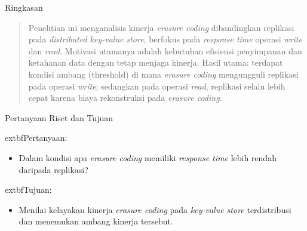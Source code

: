 \documentclass[a2,portrait]{config/poster/a0poster}
\newcommand{\postersection}[1]{%
	\begin{tcolorbox}[
		colback=ITBblue,
		colframe=ITBblue,
		fonttitle=\bfseries,
		coltext=white,
		sharp corners,
		boxrule=0pt,
		top=0pt,
		bottom=0pt,
		halign=center
	]
	\normalsize #1
	\end{tcolorbox}%
}
\begin{document}
\begin{multicols}{2} %
\small %
\vspace{0.05cm}

\newcommand{\twocolimg}[2]{%
	\begin{center}
		\parbox{\dimexpr2\columnwidth+\columnsep\relax}{%
			\centering
			\texttt{[image: \#1]}
			\captionof{figure}{#2}
		}
	\end{center}
}

\newcommand{\onecolimg}[2]{%
	\begin{center}
		\parbox{\columnwidth}{%
			\centering
			\texttt{[image: \#1]}
			\captionof{figure}{#2}
		}
	\end{center}
}


\postersection{Ringkasan}
\begin{quote}
	Penelitian ini menganalisis kinerja \textit{erasure coding} dibandingkan replikasi pada \textit{distributed key-value store}, berfokus pada \textit{response time} operasi \textit{write} dan \textit{read}. Motivasi utamanya adalah kebutuhan efisiensi penyimpanan dan ketahanan data dengan tetap menjaga kinerja. Hasil utama: terdapat kondisi ambang (threshold) di mana \textit{erasure coding} mengungguli replikasi pada operasi \textit{write}; sedangkan pada operasi \textit{read}, replikasi selalu lebih cepat karena biaya rekonstruksi pada \textit{erasure coding}.
\end{quote}


\postersection{Pertanyaan Riset dan Tujuan}
	extbf{Pertanyaan:}
\begin{itemize}[leftmargin=*, itemsep=2pt]
	\item Dalam kondisi apa \textit{erasure coding} memiliki \textit{response time} lebih rendah daripada replikasi?
\end{itemize}
	extbf{Tujuan:}
\begin{itemize}[leftmargin=*, itemsep=2pt]
	\item Menilai kelayakan kinerja \textit{erasure coding} pada \textit{key-value store} terdistribusi dan menemukan ambang kinerja tersebut.
\end{itemize}


\end{multicols}
\end{document}
